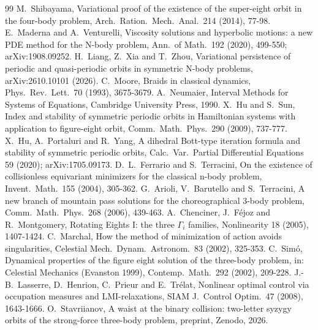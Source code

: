 \documentclass[11pt]{article}
\theoremstyle{definition}
\begin{document}
\begin{thebibliography}{99}
 M.~Shibayama, Variational proof of the existence of the super-eight orbit in the four-body
problem, Arch.\ Ration.\ Mech.\ Anal.\ 214 (2014), 77-98.
 E.~Maderna and A.~Venturelli, Viscosity solutions and hyperbolic motions: a new PDE method for the
N-body problem, Ann.\ of Math.\ 192 (2020), 499-550; arXiv:1908.09252.
 H.~Liang, Z.~Xia and T.~Zhou, Variational persistence of periodic and quasi-periodic orbits in symmetric
N-body problems, arXiv:2610.10101 (2026).
 C.~Moore, Braids in classical dynamics, Phys.\ Rev.\ Lett.\ 70 (1993), 3675-3679.
 A.~Neumaier, Interval Methods for Systems of Equations, Cambridge University Press, 1990.
 X.~Hu and S.~Sun, Index and stability of symmetric periodic orbits in Hamiltonian systems with
application to figure-eight orbit, Comm.\ Math.\ Phys.\ 290 (2009), 737-777.
 X.~Hu, A.~Portaluri and R.~Yang, A dihedral Bott-type iteration formula and stability of symmetric
periodic orbits, Calc.\ Var.\ Partial Differential Equations 59 (2020); arXiv:1705.09173.
 D.~L.~Ferrario and S.~Terracini, On the existence of collisionless equivariant minimizers for the
classical n-body problem, Invent.\ Math.\ 155 (2004), 305-362.
 G.~Arioli, V.~Barutello and S.~Terracini, A new branch of mountain pass solutions for the
choreographical 3-body problem, Comm.\ Math.\ Phys.\ 268 (2006), 439-463.
 A.~Chenciner, J.~F\'ejoz and R.~Montgomery, Rotating Eights I: the three $\Gamma_i$ families,
Nonlinearity 18 (2005), 1407-1424.
 C.~Marchal, How the method of minimization of action avoids singularities, Celestial Mech.\ Dynam.\
Astronom.\ 83 (2002), 325-353.
 C.~Sim\'o, Dynamical properties of the figure eight solution of the three-body problem, in: Celestial
Mechanics (Evanston 1999), Contemp.\ Math.\ 292 (2002), 209-228.
\bibitem{LHPT} J.-B.~Lasserre, D.~Henrion, C.~Prieur and E.~Tr\'elat, Nonlinear optimal control via occupation measures
and LMI-relaxations, SIAM J.\ Control Optim.\ 47 (2008), 1643-1666.
\bibitem{Waist} O.~Stavriianov, A waist at the binary collision: two-letter syzygy orbits of the strong-force
three-body problem, preprint, Zenodo, 2026.
\end{thebibliography}
\end{document}
